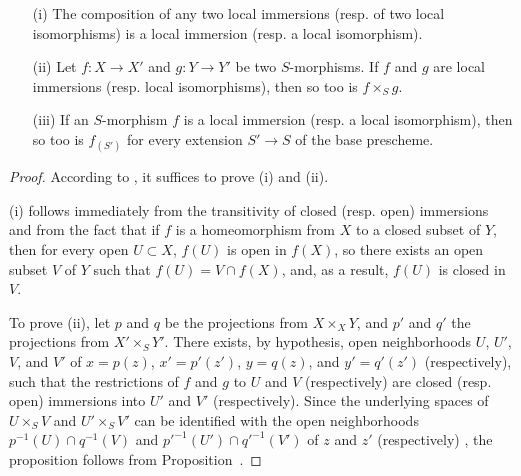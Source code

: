 \begin{proposition}[4.5.5]
\label{I.4.5.5}
\medskip\noindent
\begin{enumerate}
  \item[{\rm(i)}] The composition of any two local immersions (resp. of two local isomorphisms) is a local immersion (resp. a local isomorphism).
  \item[{\rm(ii)}] Let $f:X\to X'$ and $g:Y\to Y'$ be two $S$-morphisms.
    If $f$ and $g$ are local immersions (resp. local isomorphisms), then so too is $f\times_S g$.
  \item[{\rm(iii)}] If an $S$-morphism $f$ is a local immersion (resp. a local isomorphism), then so too is $f_{(S')}$ for every extension $S'\to S$ of the base prescheme.
\end{enumerate}
\end{proposition}

\begin{proof}
\label{proof-1.4.5.5}
According to , it suffices to prove (i) and (ii).

(i) follows immediately from the transitivity of closed (resp. open) immersions  and from the fact that if $f$ is a homeomorphism from $X$ to a closed subset of $Y$, then for every open $U\subset X$, $f(U)$ is open in $f(X)$, so there exists an open subset $V$ of $Y$ such that $f(U)=V\cap f(X)$, and, as a result, $f(U)$ is closed in $V$.

To prove (ii), let $p$ and $q$ be the projections from $X\times_X Y$, and $p'$ and $q'$ the projections from $X'\times_S Y'$.
There exists, by hypothesis, open neighborhoods $U$, $U'$, $V$, and $V'$ of $x=p(z)$, $x'=p'(z')$, $y=q(z)$, and $y'=q'(z')$ (respectively), such that the restrictions of $f$ and $g$ to $U$ and $V$ (respectively) are closed (resp. open) immersions into $U'$ and $V'$ (respectively).
Since the underlying spaces of $U\times_S V$ and $U'\times_S V'$ can be identified with the open neighborhoods $p^{-1}(U)\cap q^{-1}(V)$ and ${p'}^{-1}(U')\cap{q'}^{-1}(V')$ of $z$ and $z'$ (respectively) , the proposition follows from Proposition~.
\end{proof}


